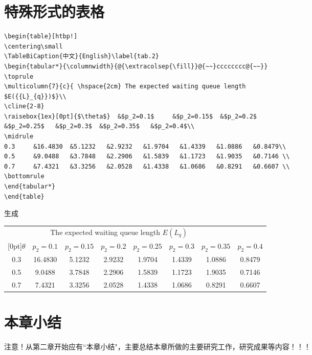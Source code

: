 \section{特殊形式的表格}\label{section3-4}
\begin{verbatim}
\begin{table}[htbp!]
\centering\small
\TableBiCaption{中文}{English}\label{tab.2}
\begin{tabular*}{\columnwidth}{@{\extracolsep{\fill}}@{~~}cccccccc@{~~}}
\toprule
\multicolumn{7}{c}{ \hspace{2cm} The expected waiting queue length
$E({{L}_{q}})$}\\
\cline{2-8}
\raisebox{1ex}[0pt]{$\theta$}  &$p_2=0.1$     &$p_2=0.15$  &$p_2=0.2$
&$p_2=0.25$   &$p_2=0.3$  &$p_2=0.35$   &$p_2=0.4$\\
\midrule
0.3     &16.4830  &5.1232   &2.9232   &1.9704   &1.4339   &1.0886   &0.8479\\
0.5     &9.0488   &3.7848   &2.2906   &1.5839   &1.1723   &1.9035   &0.7146 \\
0.7     &7.4321   &3.3256   &2.0528   &1.4338   &1.0686   &0.8291   &0.6607 \\
\bottomrule
\end{tabular*}	
\end{table}
\end{verbatim}
生成
\begin{table}[htbp!]
	\centering\small
	\label{tab.2}
	\begin{tabular*}{\columnwidth}{@{\extracolsep{\fill}}@{~~}cccccccc@{~~}}
		\toprule
		\multicolumn{7}{c}{ \hspace{2cm} The expected waiting queue length $E({{L}_{q}})$}\\
		\cline{2-8}
		\raisebox{1ex}[0pt]{$\theta$}  &$p_2=0.1$     &$p_2=0.15$  &$p_2=0.2$   &$p_2=0.25$   &$p_2=0.3$  &$p_2=0.35$   &$p_2=0.4$\\
		\midrule
		0.3     &16.4830  &5.1232   &2.9232   &1.9704   &1.4339   &1.0886   &0.8479\\
		0.5     &9.0488   &3.7848   &2.2906   &1.5839   &1.1723   &1.9035   &0.7146 \\
		0.7     &7.4321   &3.3256   &2.0528   &1.4338   &1.0686   &0.8291   &0.6607 \\
		\bottomrule
	\end{tabular*}	
\end{table}


\section{本章小结}\label{section3-5}
注意！从第二章开始应有``本章小结"，主要总结本章所做的主要研究工作，研究成果等内容！！！


%
